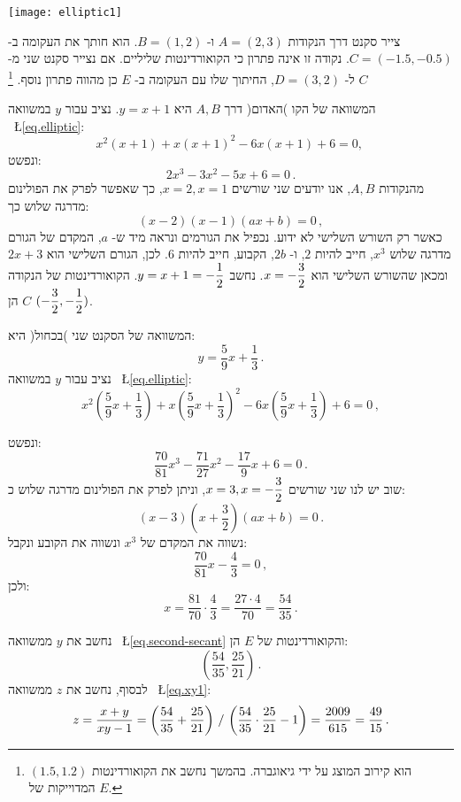 \np

\begin{center}
\texttt{[image: elliptic1]}
\end{center}


צייר סקנט דרך הנקודות
$A=(2,3)$
ו-%
$B=(1,2)$.
הוא חותך את העקומה ב-%
$C=(-1.5,-0.5)$.
נקודה זו אינה פתרון כי הקואורדינטות שליליים. אם נצייר סקנט שני מ-%
$C$
ל-%
$D=(3,2)$,
החיתוך שלו עם העקומה ב-%
$E$
כן מהווה פתרון נוסף.%
\footnote{$(1.5,1.2)$
הוא קירוב המוצג על ידי גיאוגברה. בהמשך נחשב את הקואורדינטות המדוייקות של
$E$.}

המשוואה של הקו )האדום( דרך 
$A,B$
היא
$y=x+1$. 
נציב עבור 
$y$
במשוואה%
~\L{\ref{eq.elliptic}}:
\[
x^2(x+1) + x(x+1)^2 -6x(x+1) +6 =0,\,
\]
ונפשט:
\[
2x^3 -3x^2 -5x +6 =0\,.
\]
מהנקודות
$A,B$,
אנו יודעים שני שורשים
$x=2,x=1$,
כך שאפשר לפרק את הפולינום מדרגה שלוש כך:
\[
(x-2)(x-1)(ax+b)=0\,,
\]
כאשר רק השורש השלישי לא ידוע. נכפיל את הגורמים ונראה מיד ש-%
$a$,
המקדם של הגורם מדרגה שלוש
$x^3$,
חייב להיות
$2$,
ו-%
$2b$,
הקבוע, חייב להיות
$6$.
לכן, הגורם השלישי הוא
$2x+3$
ומכאן שהשורש השלישי הוא
$x=-\displaystyle\frac{3}{2}$.
נחשב
$y=x+1=-\displaystyle\frac{1}{2}$.
הקואורדינטות של הנקודה
$C$
הן
$(-\displaystyle\frac{3}{2},-\displaystyle\frac{1}{2})$.

המשוואה של הסקנט שני )בכחול( היא:
\begin{equation}
y = \frac{5}{9}x + \frac{1}{3}\,.\label{eq.second-secant}
\end{equation}
נציב עבור 
$y$
במשוואה 
~\L{\ref{eq.elliptic}}:
\[
x^2\left(\frac{5}{9}x + \frac{1}{3}\right) + x\left(\frac{5}{9}x + \frac{1}{3}\right)^2 -6x\left(\frac{5}{9}x + \frac{1}{3}\right) +6 =0\,,
\]

\np

ונפשט:
\[
\frac{70}{81}x^3 - \frac{71}{27}x^2 - \frac{17}{9}x +6 =0\,.
\]
שוב יש לנו שני שורשים
$x=3,x=-\displaystyle\frac{3}{2}$,
וניתן לפרק את הפולינום מדרגה שלוש כ:
\[
(x-3)(x+\frac{3}{2})(ax+b)=0\,.
\]
נשווה את המקדם של 
$x^3$
ונשווה את הקובע ונקבל:
\[
\frac{70}{81}x - \frac{4}{3}=0\,,
\]
ולכן:
\[
x=\frac{81}{70}\cdot \frac{4}{3}= \frac{27\cdot 4}{70} = \frac{54}{35}\,.
\]

נחשב את
$y$
ממשוואה
~\L{\ref{eq.second-secant}}
והקואורדינטות של
$E$
הן:
\[
\left(\frac{54}{35}, \frac{25}{21}\right)\,.
\]
לבסוף, נחשב את
$z$
ממשוואה
~\L{\ref{eq.xy1}}:
\[
z=\frac{x+y}{xy-1}=%
\left(\disfrac{54}{35} + \disfrac{25}{21}\right)%
 \, / \,%
\left(\disfrac{54}{35}\cdot\disfrac{25}{21}-1\right)=%
\frac{2009}{615} = \frac{49}{15}\,.
\]

